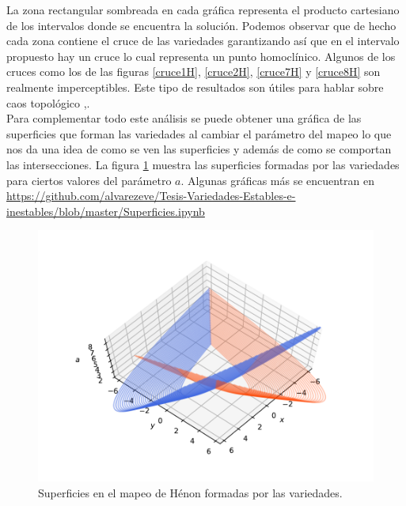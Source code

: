 La zona rectangular sombreada en cada gráfica representa el producto cartesiano de los intervalos donde se encuentra la solución. Podemos observar que de hecho cada zona contiene el cruce de las variedades garantizando así que en el intervalo propuesto hay un cruce lo cual representa un punto homoclínico. Algunos de los cruces como los de las figuras \ref{cruce1H}, \ref{cruce2H}, \ref{cruce7H} y \ref{cruce8H} son realmente imperceptibles. Este tipo de resultados son útiles para hablar sobre caos topológico \cite{devaney},\cite{gerald}.\\

Para complementar todo este análisis se puede obtener una gráfica de las superficies que forman las variedades al cambiar el parámetro del mapeo lo que nos da una idea de como se ven las superficies y además de como se comportan las intersecciones. La figura \ref{SuperficiesH} muestra las superficies formadas por las variedades para ciertos valores del parámetro $a$. Algunas gráficas más se encuentran en \url{https://github.com/alvarezeve/Tesis-Variedades-Estables-e-inestables/blob/master/Superficies.ipynb}
\begin{figure}[H]
\centering
\includegraphics[scale=0.9]{HenonV}
\caption{Superficies en el mapeo de Hénon formadas por las variedades.}
\label{SuperficiesH}
\end{figure}



